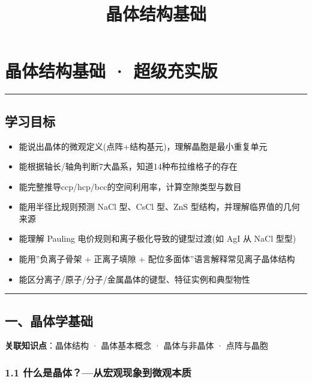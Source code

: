 \documentclass[a4paper,11pt]{ctexart}
\title{晶体结构基础}
\date{}
\providecommand{\tightlist}{\setlength{\itemsep}{0pt}\setlength{\parskip}{0pt}}
\newcommand{\箭}{\ensuremath{\rightarrow}}
\newcommand{\左箭}{\ensuremath{\leftarrow}}
\newcommand{\上箭}{\ensuremath{\uparrow}}
\newcommand{\下箭}{\ensuremath{\downarrow}}
\newcommand{\衡}{\ensuremath{\rightleftharpoons}}
\newcommand{\双箭}{\ensuremath{\leftrightarrow}}
\newcommand{\约等于}{\ensuremath{\approx}}
\newcommand{\小于等于}{\ensuremath{\leq}}
\newcommand{\大于等于}{\ensuremath{\geq}}
\newcommand{\不等于}{\ensuremath{\neq}}
\newcommand{\西格马}{\ensuremath{\sigma}}
\newcommand{\派}{\ensuremath{\pi}}
\begin{document}
\maketitle
\tableofcontents
\newpage
\section{晶体结构基础 · 超级充实版}\label{ux6676ux4f53ux7ed3ux6784ux57faux7840-ux8d85ux7ea7ux5145ux5b9eux7248}

\begin{center}\rule{0.5\linewidth}{0.5pt}\end{center}

\subsection{学习目标}\label{ux5b66ux4e60ux76eeux6807}

\begin{itemize}
\tightlist
\item
  能说出晶体的微观定义(点阵+结构基元)，理解晶胞是最小重复单元
\item
  能根据轴长/轴角判断7大晶系，知道14种布拉维格子的存在
\item
  能完整推导ccp/hcp/bcc的空间利用率，计算空隙类型与数目
\item
  能用半径比规则预测 NaCl 型、CsCl 型、ZnS 型结构，并理解临界值的几何来源
\item
  能理解 Pauling 电价规则和离子极化导致的键型过渡(如 AgI 从 NaCl 型 型)
\item
  能用''负离子骨架 + 正离子填隙 + 配位多面体''语言解释常见离子晶体结构
\item
  能区分离子/原子/分子/金属晶体的键型、特征实例和典型物性
\end{itemize}

\begin{center}\rule{0.5\linewidth}{0.5pt}\end{center}

\subsection{一、晶体学基础}\label{ux4e00ux6676ux4f53ux5b66ux57faux7840}

\textbf{关联知识点}：晶体结构 · 晶体基本概念 · 晶体与非晶体 · 点阵与晶胞

\subsubsection{1.1 什么是晶体？---从宏观现象到微观本质}\label{ux4ec0ux4e48ux662fux6676ux4f53ux4eceux5b8fux89c2ux73b0ux8c61ux5230ux5faeux89c2ux672cux8d28}
\end{document}
